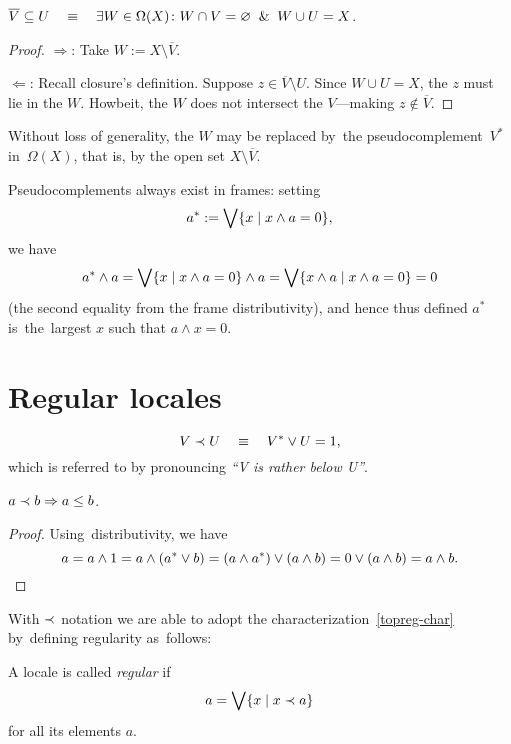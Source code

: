 \begin{lem} \label{lem:rb-char}
  $\overline{V}\subseteq U \quad \equiv \quad \exists W\in \Omega(X)\colon W \cap V =
  \varnothing \;\; \& \;\; W \cup U = X$.
\end{lem}
\begin{proof}
  $\Rightarrow$:
  Take $W := X\setminus \overline{V}$.

  $\Leftarrow$:
  Recall closure's definition.
  Suppose $z\in \overline{V}\setminus U$.
  Since $W \cup U = X$, the $z$ must lie in the $W$.
  Howbeit, the $W$ does not intersect the $V$---making $z\not\in \overline{V}$.
\end{proof}

Without loss of generality, the $W$ may be replaced by~the
pseudocomplement~$V^*$ in~$\Omega(X)$, that is, by the open set $X\setminus
\overline{V}$.

\begin{rem}
Pseudocomplements always exist in frames:
setting
\[
  a^* := \bigvee \{x \mid x \wedge a = 0\},
\]
we have
\[
  a^* \wedge a = \bigvee \{x \mid x \wedge a = 0\} \wedge a = \bigvee \{x \wedge
  a \mid x \wedge a = 0\} = 0
\]
(the second equality from the frame distributivity), and hence thus defined
$a^*$ is~the~largest $x$ such that $a \wedge x = 0$.
\end{rem}

\section{Regular locales}

\begin{framed}
  \begin{nota}[$\rb$]
    \[
      V \prec U \quad \equiv \quad V^* \vee U = 1,
    \]
    which is referred to by pronouncing \emph{``V is rather below U''\/}.
  \end{nota}
\end{framed}

\begin{lem} \label{rb->leq}
  $a \prec b \Rightarrow a \leq b$.
\end{lem}
\begin{proof}
  Using~distributivity, we have
  \[
    a = a \wedge 1 = a \wedge (a^* \vee b) = (a \wedge a^*) \vee (a \wedge b) =
    0 \vee (a \wedge b) = a \wedge b. \qedhere
  \]
\end{proof}

With $\rb$ notation we are able to adopt the characterization~\ref{topreg-char}
by~defining regularity as~follows:
\begin{framed}
  \begin{df}[Reg]
    A locale is called \emph{regular\/} if
    \[
      a = \bigvee \{x \mid x \prec a\}
    \]
    for all its elements $a$.
  \end{df}
\end{framed}

